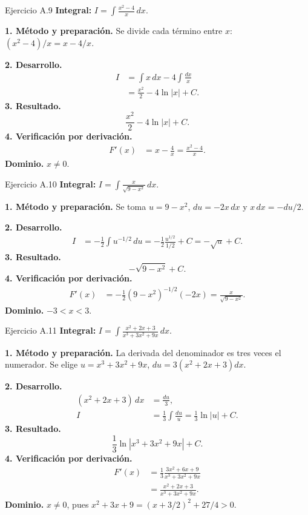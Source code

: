 \begin{examplebox}{Ejercicio A.9}
\textbf{Integral:} $\displaystyle I=\int \frac{x^2-4}{x}\,dx$.

\textbf{1. Método y preparación.} Se divide cada término entre $x$: $(x^2-4)/x=x-4/x$.

\textbf{2. Desarrollo.}
\begin{align*}
I&=\int x\,dx-4\int\frac{dx}{x}\\&=\frac{x^2}{2}-4\ln|x|+C.
\end{align*}
\textbf{3. Resultado.}
\[
\frac{x^2}{2}-4\ln|x|+C.
\]
\textbf{4. Verificación por derivación.}
\begin{align*}
F'(x)&=x-\frac4x=\frac{x^2-4}{x}.
\end{align*}
\textbf{Dominio.} $x\ne0$.
\end{examplebox}

\begin{examplebox}{Ejercicio A.10}
\textbf{Integral:} $\displaystyle I=\int \frac{x}{\sqrt{9-x^2}}\,dx$.

\textbf{1. Método y preparación.} Se toma $u=9-x^2$, $du=-2x\,dx$ y $x\,dx=-du/2$.

\textbf{2. Desarrollo.}
\begin{align*}
I&=-\frac12\int u^{-1/2}\,du=-\frac12\frac{u^{1/2}}{1/2}+C=-\sqrt u+C.
\end{align*}
\textbf{3. Resultado.}
\[
-\sqrt{9-x^2}+C.
\]
\textbf{4. Verificación por derivación.}
\begin{align*}
F'(x)&=-\frac12(9-x^2)^{-1/2}(-2x)=\frac{x}{\sqrt{9-x^2}}.
\end{align*}
\textbf{Dominio.} $-3<x<3$.
\end{examplebox}

\begin{examplebox}{Ejercicio A.11}
\textbf{Integral:} $\displaystyle I=\int \frac{x^2+2x+3}{x^3+3x^2+9x}\,dx$.

\textbf{1. Método y preparación.} La derivada del denominador es tres veces el numerador. Se elige $u=x^3+3x^2+9x$, $du=3(x^2+2x+3)dx$.

\textbf{2. Desarrollo.}
\begin{align*}
(x^2+2x+3)\,dx&=\frac{du}{3},\\I&=\frac13\int\frac{du}{u}=\frac13\ln|u|+C.
\end{align*}
\textbf{3. Resultado.}
\[
\frac13\ln|x^3+3x^2+9x|+C.
\]
\textbf{4. Verificación por derivación.}
\begin{align*}
F'(x)&=\frac13\frac{3x^2+6x+9}{x^3+3x^2+9x}\\&=\frac{x^2+2x+3}{x^3+3x^2+9x}.
\end{align*}
\textbf{Dominio.} $x\ne0$, pues $x^2+3x+9=(x+3/2)^2+27/4>0$.
\end{examplebox}

